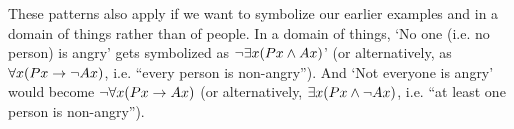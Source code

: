 These patterns also apply if we want to symbolize our earlier examples  and  in a domain of things rather than of people.  In a domain of things, `No one (i.e. no person) is angry' gets symbolized as $\neg \exists x(Px \wedge Ax)$' (or alternatively, as $\forall x(Px \rightarrow \neg Ax)$, i.e. ``every person is non-angry'').  And `Not everyone is angry' would become $\neg \forall x(Px \rightarrow Ax)$ (or alternatively, $\exists x(Px \wedge \neg Ax)$, i.e. ``at least one person is non-angry'').


